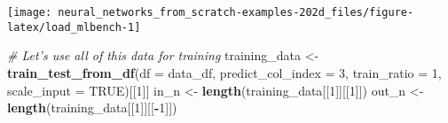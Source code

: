 \documentclass[]{book}
\newenvironment{Shaded}{\begin{snugshade}}{\end{snugshade}}
\newcommand{\CommentTok}[1]{\textcolor[rgb]{0.56,0.35,0.01}{\textit{#1}}}
\newcommand{\DataTypeTok}[1]{\textcolor[rgb]{0.13,0.29,0.53}{#1}}
\newcommand{\DecValTok}[1]{\textcolor[rgb]{0.00,0.00,0.81}{#1}}
\newcommand{\KeywordTok}[1]{\textcolor[rgb]{0.13,0.29,0.53}{\textbf{#1}}}
\newcommand{\NormalTok}[1]{#1}
\newcommand{\OperatorTok}[1]{\textcolor[rgb]{0.81,0.36,0.00}{\textbf{#1}}}
\newcommand{\OtherTok}[1]{\textcolor[rgb]{0.56,0.35,0.01}{#1}}
\newcommand{\StringTok}[1]{\textcolor[rgb]{0.31,0.60,0.02}{#1}}
\begin{document}
\begin{center}\texttt{[image: neural\_networks\_from\_scratch-examples-202d\_files/figure-latex/load\_mlbench-1]} \end{center}

\begin{Shaded}
\begin{Highlighting}[]
\CommentTok{# Let's use all of this data for training}
\NormalTok{training_data <-}\StringTok{ }\KeywordTok{train_test_from_df}\NormalTok{(}\DataTypeTok{df =}\NormalTok{ data_df, }\DataTypeTok{predict_col_index =} \DecValTok{3}\NormalTok{, }
                                    \DataTypeTok{train_ratio =} \DecValTok{1}\NormalTok{, }\DataTypeTok{scale_input =} \OtherTok{TRUE}\NormalTok{)[[}\DecValTok{1}\NormalTok{]]}
\NormalTok{in_n <-}\StringTok{ }\KeywordTok{length}\NormalTok{(training_data[[}\DecValTok{1}\NormalTok{]][[}\DecValTok{1}\NormalTok{]])}
\NormalTok{out_n <-}\StringTok{ }\KeywordTok{length}\NormalTok{(training_data[[}\DecValTok{1}\NormalTok{]][[}\OperatorTok{-}\DecValTok{1}\NormalTok{]])}
\end{Highlighting}
\end{Shaded}
\end{document}
